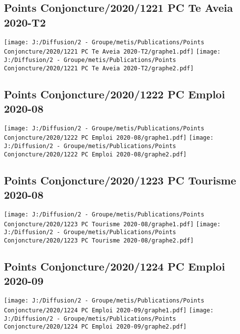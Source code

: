 \documentclass[
]{article}
\begin{document}
\hypertarget{points-conjoncture20201221-pc-te-aveia-2020-t2}{%
\subsection{Points Conjoncture/2020/1221 PC Te Aveia
2020-T2}\label{points-conjoncture20201221-pc-te-aveia-2020-t2}}

\texttt{[image: J:/Diffusion/2 - Groupe/metis/Publications/Points Conjoncture/2020/1221 PC Te Aveia 2020-T2/graphe1.pdf]}
\texttt{[image: J:/Diffusion/2 - Groupe/metis/Publications/Points Conjoncture/2020/1221 PC Te Aveia 2020-T2/graphe2.pdf]}

\hypertarget{points-conjoncture20201222-pc-emploi-2020-08}{%
\subsection{Points Conjoncture/2020/1222 PC Emploi
2020-08}\label{points-conjoncture20201222-pc-emploi-2020-08}}

\texttt{[image: J:/Diffusion/2 - Groupe/metis/Publications/Points Conjoncture/2020/1222 PC Emploi 2020-08/graphe1.pdf]}
\texttt{[image: J:/Diffusion/2 - Groupe/metis/Publications/Points Conjoncture/2020/1222 PC Emploi 2020-08/graphe2.pdf]}

\hypertarget{points-conjoncture20201223-pc-tourisme-2020-08}{%
\subsection{Points Conjoncture/2020/1223 PC Tourisme
2020-08}\label{points-conjoncture20201223-pc-tourisme-2020-08}}

\texttt{[image: J:/Diffusion/2 - Groupe/metis/Publications/Points Conjoncture/2020/1223 PC Tourisme 2020-08/graphe1.pdf]}
\texttt{[image: J:/Diffusion/2 - Groupe/metis/Publications/Points Conjoncture/2020/1223 PC Tourisme 2020-08/graphe2.pdf]}

\hypertarget{points-conjoncture20201224-pc-emploi-2020-09}{%
\subsection{Points Conjoncture/2020/1224 PC Emploi
2020-09}\label{points-conjoncture20201224-pc-emploi-2020-09}}

\texttt{[image: J:/Diffusion/2 - Groupe/metis/Publications/Points Conjoncture/2020/1224 PC Emploi 2020-09/graphe1.pdf]}
\texttt{[image: J:/Diffusion/2 - Groupe/metis/Publications/Points Conjoncture/2020/1224 PC Emploi 2020-09/graphe2.pdf]}
\end{document}
